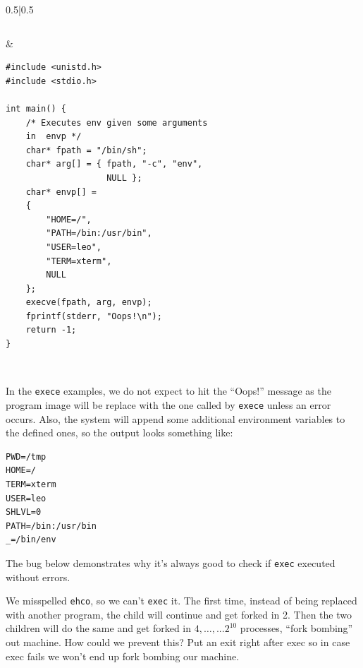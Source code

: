 \documentclass[a4paper]{article}
\begin{document}
\begin{tabular}{0.5\textwidth|0.5\textwidth}
\begin{lstlisting}
\end{lstlisting}&
\begin{lstlisting}
#include <unistd.h>
#include <stdio.h>

int main() {
	/* Executes env given some arguments   
	in  envp */
	char* fpath = "/bin/sh";
    char* arg[] = { fpath, "-c", "env", 
                    NULL };
    char* envp[] =
    {
        "HOME=/",
        "PATH=/bin:/usr/bin",
		"USER=leo", 
		"TERM=xterm", 
       	NULL 
    };
    execve(fpath, arg, envp);
    fprintf(stderr, "Oops!\n");
    return -1;
}

\end{lstlisting}\\
\end{tabular} 
\lstset{style=code1}

In the \texttt{exece} examples, we do not expect to hit the ``Oops!'' message as the program image will be replace with the one called by \texttt{exece} unless an error occurs. Also, the system will append some additional environment variables to the defined ones, so the output looks something like:
\begin{verbatim}
PWD=/tmp
HOME=/
TERM=xterm
USER=leo
SHLVL=0
PATH=/bin:/usr/bin
_=/bin/env
\end{verbatim}
The bug below demonstrates why it's always good to check if \texttt{exec} executed without errors.
We misspelled \texttt{ehco}, so we can't \texttt{exec} it. The first time, instead of being replaced with another program, the child will continue and get forked in 2. Then the two children will do the same and get forked in $4,\ldots, ... 2^{10}$ processes, ``fork bombing'' out machine. How could we prevent this? Put an exit right after exec so in case exec fails we won't end up fork bombing our machine.
\end{document}

